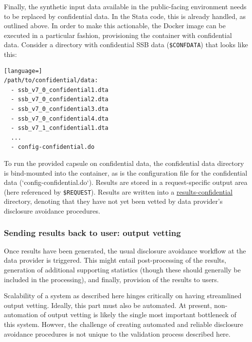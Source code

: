 \documentclass[]{hdsr}
\begin{document}
Finally, the synthetic input data available in the public-facing environment needs to be replaced by confidential data. In the Stata code, this is already handled, as outlined above. In order to make this actionable, the Docker image can be executed in a particular fashion, provisioning the container with confidential data. Consider a directory with confidential SSB data (\texttt{\$CONFDATA}) that looks like this:

\begin{lstlisting}[language=]
/path/to/confidential/data:
  - ssb_v7_0_confidential1.dta
  - ssb_v7_0_confidential2.dta
  - ssb_v7_0_confidential3.dta
  - ssb_v7_0_confidential4.dta
  - ssb_v7_1_confidential1.dta
  ...
  - config-confidential.do   
\end{lstlisting}

To run the provided capsule on confidential data, the confidential data directory is  bind-mounted into the container, as is the configuration file for the confidential data (`config-confidential.do`). Results are stored in a request-specific output area (here referenced by \texttt{\$REQUEST}). Results are written into a \url{results-confidential} directory, denoting that they have not yet been vetted by data provider's disclosure avoidance procedures.








\subsubsection{Sending results back to user: output vetting}

Once results have been generated, the usual disclosure avoidance workflow at the data provider is triggered. This might entail post-processing of the results, generation of additional supporting statistics (though these should generally be included in the processing), and finally, provision of the results to users. 

Scalability of a system as described here hinges critically on having streamlined output vetting. Ideally, this  part must also be automated. At present, non-automation of output vetting is likely the single most important bottleneck of this system. Howver, the challenge of creating automated and reliable disclosure avoidance procedures is  not unique to the validation process described here.
\end{document}
